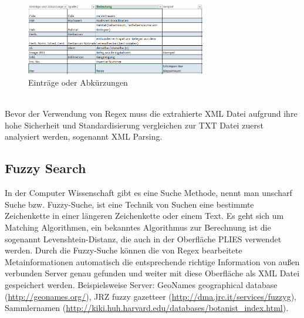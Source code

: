 \documentclass[10pt,a4paper]{report}
\begin{document}
 \begin{figure}[htbp] 
 	\centering
 	\includegraphics[width=0.7\textwidth]{Regex.png}
 	\caption{Einträge oder Abkürzungen}
 	\label{fig:Bild 3.2}
 \end{figure}\\
Bevor der Verwendung von Regex muss die extrahierte XML Datei aufgrund ihre hohe Sicherheit und Standardisierung vergleichen zur TXT Datei zuerst analysiert werden, sogenannt XML Parsing. 

\subsection{Fuzzy Search}
In der Computer Wissenschaft gibt es eine Suche Methode, nennt man unscharf Suche bzw. Fuzzy-Suche, ist eine Technik von Suchen eine bestimmte Zeichenkette in einer längeren Zeichenkette oder einem Text. Es geht sich um Matching Algorithmen, ein bekanntes Algorithmus zur Berechnung ist die sogenannt Levenshtein-Distanz, die auch in der Oberfläche PLIES verwendet werden.  
Durch die Fuzzy-Suche können die von Regex bearbeitete Metainformationen  automatisch die entsprechende richtige Information von außen verbunden Server genau gefunden und weiter mit diese Oberfläche als XML Datei gespeichert werden. Beispielsweise Server: GeoNames geographical database (\href{http://geonames.org/}{http://geonames.org/}), JRZ fuzzy gazetteer (\href{http://dma.jrc.it/services/fuzzyg}{http://dma.jrc.it/services/fuzzyg}), Sammlernamen (\href{http://kiki.huh.harvard.edu/databases/botanist\_index.html}{http://kiki.huh.harvard.edu/databases/botanist\_index.html}).
\end{document}
